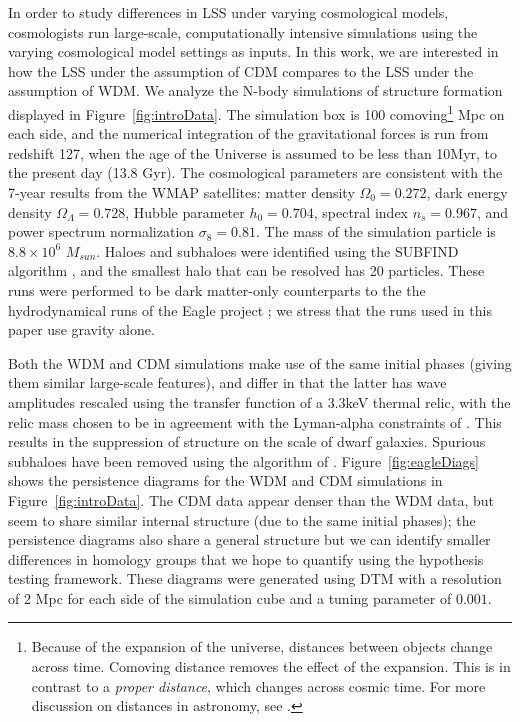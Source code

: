 \documentclass[12pt]{article}
\newcommand{\figref}[1]{Figure~\ref{#1}}
\begin{document}
In order to study differences in LSS under varying cosmological models, cosmologists run large-scale, computationally intensive simulations using the varying cosmological model settings as inputs.  In this work, we are interested in how the LSS under the assumption of CDM compares to the LSS under the assumption of WDM.
We analyze the N-body simulations of structure formation displayed in Figure~\ref{fig:introData}. The simulation box is 100 comoving\footnote{Because of the expansion of the universe, distances between objects change across time.  Comoving distance removes the effect of the expansion.  This is in contrast to a \emph{proper distance}, which changes across cosmic time.  For more discussion on distances in astronomy, see \cite{Hogg:1999aa}.} Mpc on each side, and the numerical integration of the gravitational forces is run from redshift 127, when the age of the Universe is assumed to be less than 10Myr, to the present day (13.8 Gyr). The cosmological parameters are consistent with the 7-year results from the WMAP satellites: matter density $\Omega_0 = 0.272$, dark energy density $\Omega_{\Lambda} = 0.728$, Hubble parameter $h_0 = 0.704$, spectral index $n_s=0.967$, and power spectrum normalization $\sigma_8=0.81$. The mass of the simulation particle is $8.8 \times 10^6$ $M_{sun}$. Haloes and subhaloes were identified using the SUBFIND algorithm \citep{springel2001populating}, and the smallest halo that can be resolved has 20 particles. These runs were performed to be dark matter-only counterparts to the the hydrodynamical runs of the Eagle project \citep{schaye2015eagle}; we stress that the runs used in this paper use gravity alone.


Both the WDM and CDM simulations make use of the same initial phases (giving them similar large-scale features), and differ in that the latter has wave amplitudes rescaled using the transfer function of a 3.3keV thermal relic, with the relic mass chosen to be in agreement with the Lyman-alpha constraints of \citep{viel2013warm}. This results in the suppression of structure on the scale of dwarf galaxies. Spurious subhaloes have been removed using the algorithm of \citep{lovell2014properties}. \figref{fig:eagleDiags} shows the persistence diagrams for the WDM and CDM simulations in Figure~\ref{fig:introData}.   The CDM data appear denser than the WDM data, but seem to share similar internal structure (due to the same initial phases); the persistence diagrams also share a general structure but we can identify smaller differences in homology groups that we hope to quantify using the hypothesis testing framework. 
These diagrams were generated using DTM with a resolution of $2$ Mpc for each side of the simulation cube and a tuning parameter of $0.001$.
\end{document}
